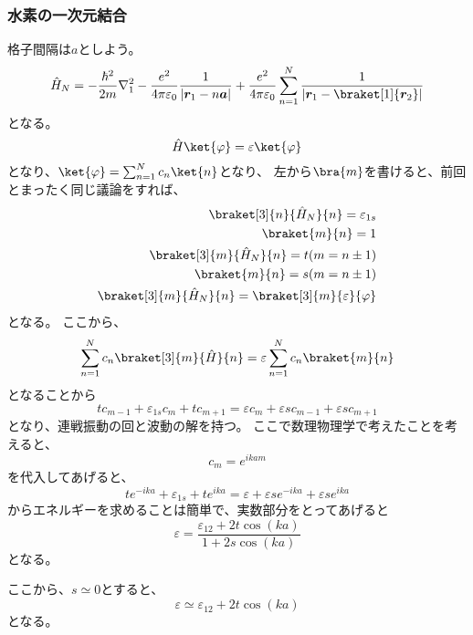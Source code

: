 \documentclass[titlepage]{ltjsarticle}
\newcommand{\mel}[3]{\braket[3]{#1}{#2}{#3}}
\newcommand{\ev}[1]{\braket[1]{#1}}
\begin{document}
\subsubsection{水素の一次元結合}
格子間隔は\(a\)としよう。
\begin{equation}
  \hat{H}_N = - \frac{\hbar^2}{2m} \nabla_1^2 - \frac{e^2}{4\pi \varepsilon_0} \frac{1}{|\bm{r}_1- n\bm{a}|} + \frac{e^2}{4\pi \varepsilon_0} \sum^N_{n=1} \frac{1}{|\bm{r}_1-\ev{\bm{r}_2}|}
\end{equation}
となる。
\begin{equation}
  \hat{H}\ket{\varphi} = \varepsilon \ket{\varphi}
\end{equation}
となり、\(\ket{\varphi} = \sum_{n=1}^{N}c_n \ket{n}\)となり、
左から\(\bra{m}\)を書けると、前回とまったく同じ議論をすれば、
\begin{align}
  \mel{n}{\hat{H}_N}{n} = \varepsilon_{1s} \\
  \braket{m}{n} = 1 \\
  \mel{m}{\hat{H}_N}{n} = t (m=n \pm 1) \\
  \braket{m}{n} = s (m = n \pm 1) \\
  \mel{m}{\hat{H}_N}{n} = \mel{m}{\varepsilon}{\varphi}
\end{align}
となる。
ここから、
\begin{equation}
  \sum_{n=1}^{N}c_n \mel{m}{\hat{H}}{n} = \varepsilon \sum_{n=1}^{N}c_n \braket{m}{n}
\end{equation}
となることから
\begin{equation}
  t c_{m-1} + \varepsilon_{1s} c_m + t c_{m+1}  = \varepsilon c_m + \varepsilon s c_{m-1} + \varepsilon s c_{m+1}
\end{equation}
となり、連戦振動の回と波動の解を持つ。
ここで数理物理学で考えたことを考えると、
\begin{equation}
  c_m = e^{ikam}
\end{equation}
を代入してあげると、
\begin{equation}
  t e^{-ika} + \varepsilon_{1s} + t e^{ika} = \varepsilon + \varepsilon s e^{-ika} + \varepsilon s e^{ika}
\end{equation}
からエネルギーを求めることは簡単で、実数部分をとってあげると
\begin{equation}
  \varepsilon = \frac{\varepsilon_{12}+2t \cos (ka)}{1+2s \cos(ka)}
\end{equation}
となる。

ここから、\(s\simeq 0\)とすると、
\begin{equation}
  \varepsilon \simeq \varepsilon_{12} + 2 t \cos(ka)
\end{equation}
となる。
\end{document}
